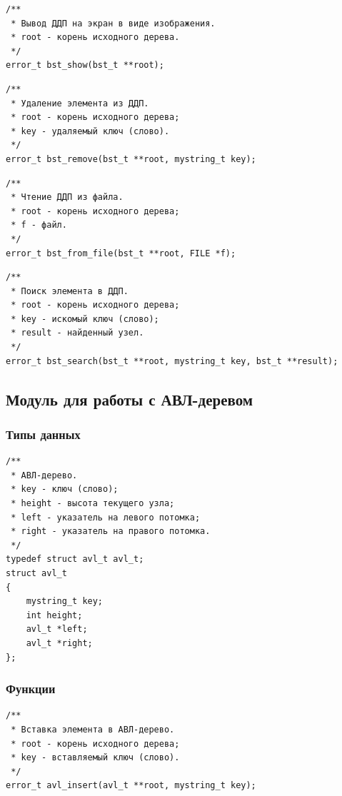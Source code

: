 \documentclass[a4paper,12pt]{extarticle}
\begin{document}
\begin{verbatim}
/**
 * Вывод ДДП на экран в виде изображения.
 * root - корень исходного дерева.
 */
error_t bst_show(bst_t **root);
\end{verbatim}


\begin{verbatim}
/**
 * Удаление элемента из ДДП.
 * root - корень исходного дерева;
 * key - удаляемый ключ (слово).
 */
error_t bst_remove(bst_t **root, mystring_t key);
\end{verbatim}


\begin{verbatim}
/**
 * Чтение ДДП из файла.
 * root - корень исходного дерева;
 * f - файл.
 */
error_t bst_from_file(bst_t **root, FILE *f);
\end{verbatim}


\begin{verbatim}
/**
 * Поиск элемента в ДДП.
 * root - корень исходного дерева;
 * key - искомый ключ (слово);
 * result - найденный узел.
 */
error_t bst_search(bst_t **root, mystring_t key, bst_t **result);
\end{verbatim}


\subsection{Модуль для работы с АВЛ-деревом}

\subsubsection{Типы данных}

\begin{verbatim}
/**
 * АВЛ-дерево.
 * key - ключ (слово);
 * height - высота текущего узла;
 * left - указатель на левого потомка;
 * right - указатель на правого потомка.
 */
typedef struct avl_t avl_t;
struct avl_t
{
    mystring_t key;
    int height;
    avl_t *left;
    avl_t *right;
};
\end{verbatim}

\subsubsection{Функции}

\begin{verbatim}
/**
 * Вставка элемента в АВЛ-дерево.
 * root - корень исходного дерева;
 * key - вставляемый ключ (слово).
 */
error_t avl_insert(avl_t **root, mystring_t key);
\end{verbatim}
\end{document}
